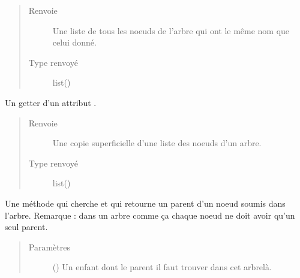 \documentclass[letterpaper,10pt,french]{sphinxmanual}
\begin{document}
\begin{fulllineitems}
\begin{fulllineitems}
\begin{quote}
\begin{description}
\item[{Renvoie}] \leavevmode
{} \textendash{} Une liste de tous les noeuds de l’arbre qui ont le même nom que celui donné.

\item[{Type renvoyé}] \leavevmode
list({\hyperref[\detokenize{index:StrategyTree.NodeST}]{}})

\end{description}\end{quote}

\end{fulllineitems}


\begin{fulllineitems}
\label{\detokenize{index:StrategyTree.StrategyTree.get_nodes}}
Un getter d’un attribut .
\begin{quote}\begin{description}
\item[{Renvoie}] \leavevmode
{} \textendash{} Une copie superficielle d’une liste des noeuds d’un arbre.

\item[{Type renvoyé}] \leavevmode
list({\hyperref[\detokenize{index:StrategyTree.NodeST}]{}})

\end{description}\end{quote}

\end{fulllineitems}


\begin{fulllineitems}
\label{\detokenize{index:StrategyTree.StrategyTree.get_parent}}
Une méthode qui cherche et qui retourne un parent d’un noeud soumis dans l’arbre. Remarque : dans un arbre comme
ça chaque noeud ne doit avoir qu’un seul parent.
\begin{quote}\begin{description}
\item[{Paramètres}] \leavevmode
{} () \textendash{} Un enfant dont le parent il faut trouver dans cet arbre\sphinxhyphen{}là.


\end{description}
\end{quote}
\end{fulllineitems}
\end{fulllineitems}
\end{document}
